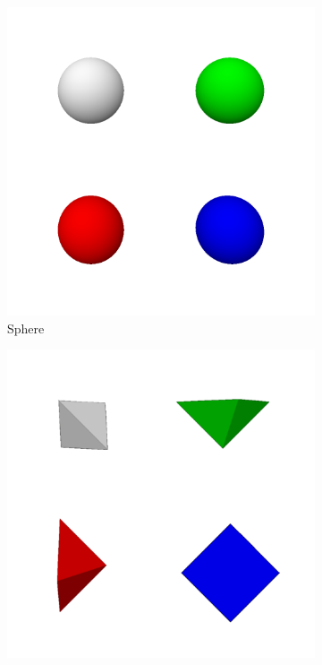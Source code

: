 \documentclass{l4proj}
\begin{document}
\begin{figure}[H]
  \begin{subfigure}[b]{0.33\textwidth}
    \includegraphics[width=\textwidth]{images/representations/multi-sphere.png}
    \caption{Sphere}
    \label{fig:rep_multi-sphere}
  \end{subfigure}
  \begin{subfigure}[b]{0.33\textwidth}
    \includegraphics[width=\textwidth]{images/representations/multi-penta.png}

\end{subfigure}
\end{figure}
\end{document}
